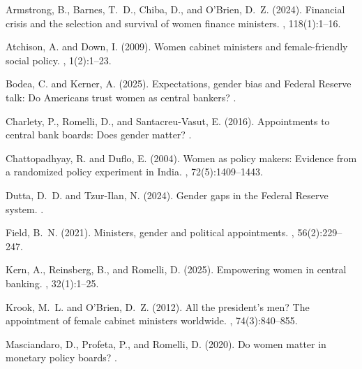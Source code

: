 \documentclass[12pt]{article}
\begin{document}
\begin{thebibliography}{}
 
Armstrong, B., Barnes, T.~D., Chiba, D., and O'Brien, D.~Z. (2024).
\newblock Financial crisis and the selection and survival of women finance
  ministers.
, 118(1):1--16.
 
Atchison, A. and Down, I. (2009).
\newblock Women cabinet ministers and female-friendly social policy.
, 1(2):1--23.
 
Bodea, C. and Kerner, A. (2025).
\newblock Expectations, gender bias and {Federal Reserve} talk: Do {Americans}
  trust women as central bankers?
.
 
Charlety, P., Romelli, D., and Santacreu-Vasut, E. (2016).
\newblock Appointments to central bank boards: Does gender matter?
.
 
Chattopadhyay, R. and Duflo, E. (2004).
\newblock Women as policy makers: Evidence from a randomized policy experiment
  in {India}.
, 72(5):1409--1443.
 
Dutta, D.~D. and Tzur-Ilan, N. (2024).
\newblock Gender gaps in the {Federal Reserve} system.
.
 
Field, B.~N. (2021).
\newblock Ministers, gender and political appointments.
, 56(2):229--247.
 
Kern, A., Reinsberg, B., and Romelli, D. (2025).
\newblock Empowering women in central banking.
, 32(1):1--25.
 
Krook, M.~L. and O'Brien, D.~Z. (2012).
\newblock All the president's men? {The} appointment of female cabinet
  ministers worldwide.
, 74(3):840--855.
 
Masciandaro, D., Profeta, P., and Romelli, D. (2020).
\newblock Do women matter in monetary policy boards?
.
 

\end{thebibliography}
\end{document}
